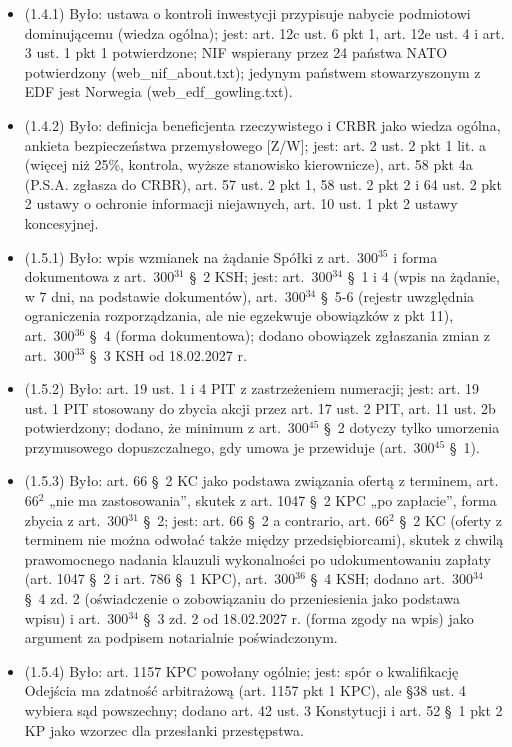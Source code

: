 \documentclass[12pt,a4paper]{report}
\begin{document}
\begin{itemize}
  \item (1.4.1) Było: ustawa o kontroli inwestycji przypisuje nabycie podmiotowi dominującemu (wiedza ogólna); jest: art. 12c ust. 6 pkt 1, art. 12e ust. 4 i art. 3 ust. 1 pkt 1 potwierdzone; NIF wspierany przez 24 państwa NATO potwierdzony (web\_nif\_about.txt); jedynym państwem stowarzyszonym z EDF jest Norwegia (web\_edf\_gowling.txt).
  \item (1.4.2) Było: definicja beneficjenta rzeczywistego i CRBR jako wiedza ogólna, ankieta bezpieczeństwa przemysłowego [Z/W]; jest: art. 2 ust. 2 pkt 1 lit. a (więcej niż 25\%, kontrola, wyższe stanowisko kierownicze), art. 58 pkt 4a (P.S.A. zgłasza do CRBR), art. 57 ust. 2 pkt 1, 58 ust. 2 pkt 2 i 64 ust. 2 pkt 2 ustawy o ochronie informacji niejawnych, art. 10 ust. 1 pkt 2 ustawy koncesyjnej.
  \item (1.5.1) Było: wpis wzmianek na żądanie Spółki z art.~300$^{35}$ i forma dokumentowa z art.~300$^{31}$ §~2 KSH; jest: art.~300$^{34}$ §~1 i 4 (wpis na żądanie, w 7 dni, na podstawie dokumentów), art.~300$^{34}$ §~5-6 (rejestr uwzględnia ograniczenia rozporządzania, ale nie egzekwuje obowiązków z pkt 11), art.~300$^{36}$ §~4 (forma dokumentowa); dodano obowiązek zgłaszania zmian z art.~300$^{33}$ §~3 KSH od 18.02.2027 r.
  \item (1.5.2) Było: art. 19 ust. 1 i 4 PIT z zastrzeżeniem numeracji; jest: art. 19 ust. 1 PIT stosowany do zbycia akcji przez art. 17 ust. 2 PIT, art. 11 ust. 2b potwierdzony; dodano, że minimum z art.~300$^{45}$ §~2 dotyczy tylko umorzenia przymusowego dopuszczalnego, gdy umowa je przewiduje (art.~300$^{45}$ §~1).
  \item (1.5.3) Było: art. 66 §~2 KC jako podstawa związania ofertą z terminem, art. 66$^{2}$ „nie ma zastosowania”, skutek z art. 1047 §~2 KPC „po zapłacie”, forma zbycia z art.~300$^{31}$ §~2; jest: art. 66 §~2 a contrario, art. 66$^{2}$ §~2 KC (oferty z terminem nie można odwołać także między przedsiębiorcami), skutek z chwilą prawomocnego nadania klauzuli wykonalności po udokumentowaniu zapłaty (art. 1047 §~2 i art. 786 §~1 KPC), art.~300$^{36}$ §~4 KSH; dodano art.~300$^{34}$ §~4 zd. 2 (oświadczenie o zobowiązaniu do przeniesienia jako podstawa wpisu) i art.~300$^{34}$ §~3 zd. 2 od 18.02.2027 r. (forma zgody na wpis) jako argument za podpisem notarialnie poświadczonym.
  \item (1.5.4) Było: art. 1157 KPC powołany ogólnie; jest: spór o kwalifikację Odejścia ma zdatność arbitrażową (art. 1157 pkt 1 KPC), ale §38 ust. 4 wybiera sąd powszechny; dodano art. 42 ust. 3 Konstytucji i art. 52 §~1 pkt 2 KP jako wzorzec dla przesłanki przestępstwa.

\end{itemize}
\end{document}
